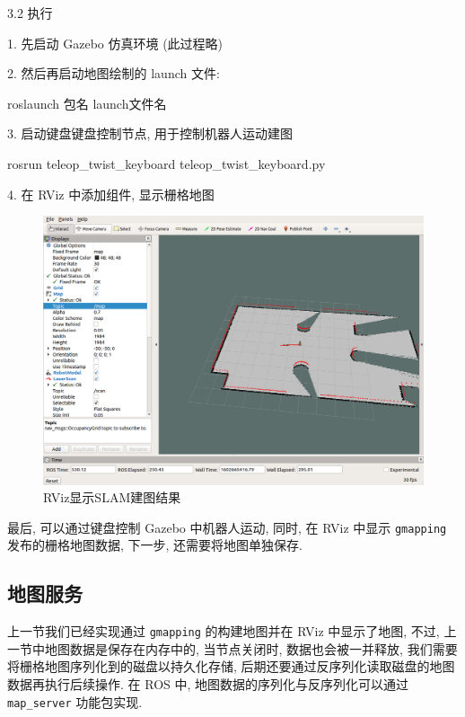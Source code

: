 \documentclass[openany, fontset=windowsold]{ctexbook}
\theoremstyle{kaiti}
\theoremstyle{normal}
\begin{document}
3.2 执行

1. 先启动 Gazebo 仿真环境 (此过程略)

2. 然后再启动地图绘制的 launch 文件:

\begin{bash}
  roslaunch 包名 launch文件名
\end{bash}

3. 启动键盘键盘控制节点, 用于控制机器人运动建图

\begin{bash}
  rosrun teleop_twist_keyboard teleop_twist_keyboard.py
\end{bash}

4. 在 RViz 中添加组件, 显示栅格地图

\begin{figure}[!ht]
  \centering
  \includegraphics[width=.9\textwidth]{ros_demo_nav_slam_rviz.png}
  \caption{RViz显示SLAM建图结果}
  \label{fig:ros_demo_nav_slam_rviz}
\end{figure}

最后, 可以通过键盘控制 Gazebo 中机器人运动, 同时, 在 RViz 中显示 \verb|gmapping| 发布的栅格地图数据, 下一步, 还需要将地图单独保存.

\subsection{地图服务}

上一节我们已经实现通过 \verb|gmapping| 的构建地图并在 RViz 中显示了地图, 不过, 上一节中地图数据是保存在内存中的, 当节点关闭时, 数据也会被一并释放, 我们需要将栅格地图序列化到的磁盘以持久化存储, 后期还要通过反序列化读取磁盘的地图数据再执行后续操作. 在 ROS 中, 地图数据的序列化与反序列化可以通过 \verb|map_server| 功能包实现.
\end{document}
